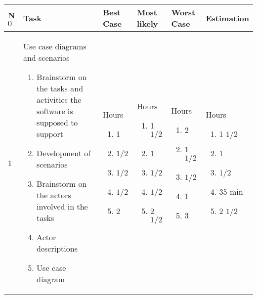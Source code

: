 \begin{left}
	\def\arraystretch{1.5}%
    \begin{tabular}{ | l | p{5cm} | p{2cm} | p{2cm} | p{2cm} | p{2cm} |}
    \hline
	\textbf{N$0$} & \textbf{Task} & \textbf{Best Case} & \textbf{Most likely} & \textbf{Worst Case} & \textbf{Estimation} \\ \hline 
	
	1 & Use case diagrams and scenarios \begin{enumerate}
		\item Brainstorm on the tasks and activities the software is supposed to support
		\item Development of scenarios 
		\item Brainstorm on the actors involved in the tasks
		\item Actor descriptions
		\item Use case diagram
	\end{enumerate} & Hours \begin{enumerate} %
		\item 1
		\item $1/2$
		\item $1/2$
		\item $1/2$
		\item 2
	\end{enumerate} & Hours \begin{enumerate} %
		\item 1 $1/2$
		\item 1
		\item $1/2$
		\item $1/2$
		\item 2 $1/2$
	\end{enumerate} & Hours \begin{enumerate} %
		\item 2
		\item 1 $1/2$
		\item $1/2$
		\item 1
		\item 3
	\end{enumerate} & Hours \begin{enumerate} %
		\item 1 $1/2$
		\item 1 		
		\item $1/2$
		\item 35 min
		\item 2 $1/2$
	\end{enumerate} \\ \hline 	


\end{tabular}
\end{left}
